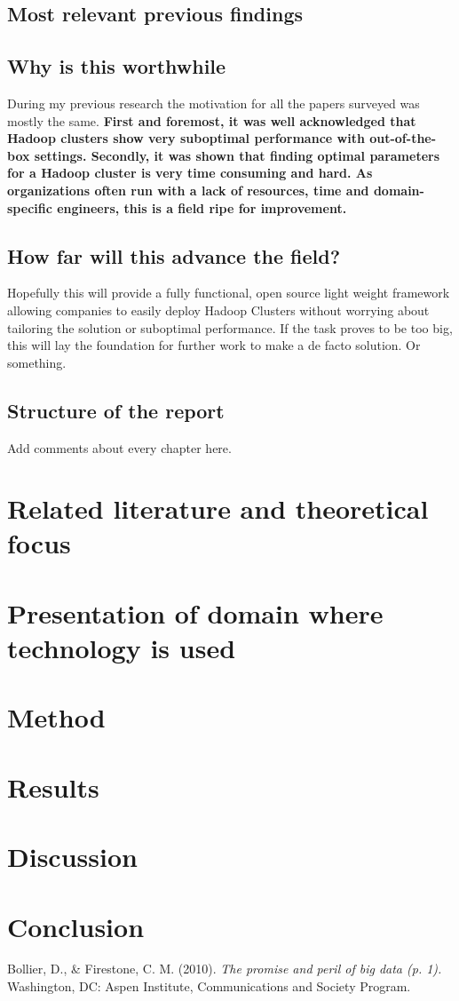 \documentclass[a4paper,english]{report}
\begin{document}
		\section{Most relevant previous findings}
		\section{Why is this worthwhile}
		During my previous research the motivation for all the papers surveyed was mostly the same. \textbf{First and foremost, it was well acknowledged that Hadoop clusters show very suboptimal performance with out-of-the-box settings. Secondly, it was shown that finding optimal parameters for a Hadoop cluster is very time consuming and hard. As organizations often run with a lack of resources, time and domain-specific engineers, this is a field ripe for improvement.}
		\section{How far will this advance the field?}
		Hopefully this will provide a fully functional, open source light weight framework allowing companies to easily deploy Hadoop Clusters without worrying about tailoring the solution or suboptimal performance. If the task proves to be too big, this will lay the foundation for further work to make a de facto solution. Or something.
		\section{Structure of the report}
		Add comments about every chapter here.
	\chapter{Related literature and theoretical focus}
	\chapter{Presentation of domain where technology is used}
	\chapter{Method}
	\chapter{Results}
	\chapter{Discussion}
	\chapter{Conclusion}
	\begin{thebibliography}{1}
		
		Bollier, D., \& Firestone, C. M. (2010). \emph{The promise and peril of big data (p. 1).} Washington, DC: Aspen Institute, Communications and Society Program.
	\end{thebibliography}
\end{document}

